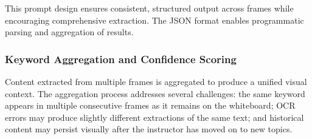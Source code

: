 This prompt design ensures consistent, structured output across frames while encouraging comprehensive extraction. The JSON format enables programmatic parsing and aggregation of results.

\subsubsection{Keyword Aggregation and Confidence Scoring}

Content extracted from multiple frames is aggregated to produce a unified visual context. The aggregation process addresses several challenges: the same keyword appears in multiple consecutive frames as it remains on the whiteboard; OCR errors may produce slightly different extractions of the same text; and historical content may persist visually after the instructor has moved on to new topics.

%
%

